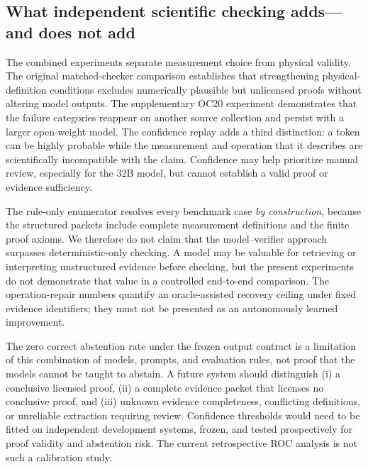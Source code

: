 \subsection{What independent scientific checking adds---and does not add}
\label{sec:external_discussion}

The combined experiments separate measurement choice from physical validity. The original matched-checker comparison establishes that strengthening physical-definition conditions excludes numerically plausible but unlicensed proofs without altering model outputs. The supplementary OC20 experiment demonstrates that the failure categories reappear on another source collection and persist with a larger open-weight model. The confidence replay adds a third distinction: a token can be highly probable while the measurement and operation that it describes are scientifically incompatible with the claim. Confidence may help prioritize manual review, especially for the 32B model, but cannot establish a valid proof or evidence sufficiency.

The rule-only enumerator resolves every benchmark case \emph{by construction}, because the structured packets include complete measurement definitions and the finite proof axioms. We therefore do not claim that the model--verifier approach surpasses deterministic-only checking. A model may be valuable for retrieving or interpreting unstructured evidence before checking, but the present experiments do not demonstrate that value in a controlled end-to-end comparison. The operation-repair numbers quantify an oracle-assisted recovery ceiling under fixed evidence identifiers; they must not be presented as an autonomously learned improvement.

The zero correct abstention rate under the frozen output contract is a limitation of this combination of models, prompts, and evaluation rules, not proof that the models cannot be taught to abstain. A future system should distinguish (i) a conclusive licensed proof, (ii) a complete evidence packet that licenses no conclusive proof, and (iii) unknown evidence completeness, conflicting definitions, or unreliable extraction requiring review. Confidence thresholds would need to be fitted on independent development systems, frozen, and tested prospectively for proof validity and abstention risk. The current retrospective ROC analysis is not such a calibration study.

